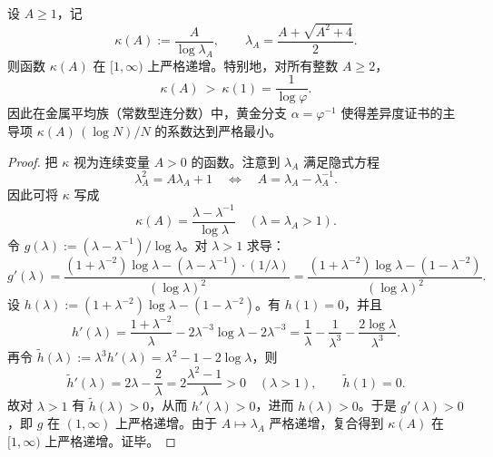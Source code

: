 \begin{theorem}\label{thm:metallic-gap}
设 $A\ge 1$，记
\[
\kappa(A):=\frac{A}{\log\lambda_A},\qquad \lambda_A=\frac{A+\sqrt{A^2+4}}{2}.
\]
则函数 $\kappa(A)$ 在 $[1,\infty)$ 上严格递增。特别地，对所有整数 $A\ge 2$，
\[
\kappa(A)\ >\ \kappa(1)=\frac{1}{\log\varphi}.
\]
因此在金属平均族（常数型连分数）中，黄金分支 $\alpha=\varphi^{-1}$ 使得差异度证书的主导项 \(\kappa(A)\,(\log N)/N\) 的系数达到严格最小。
\end{theorem}

\begin{proof}
把 $\kappa$ 视为连续变量 $A>0$ 的函数。注意到 $\lambda_A$ 满足隐式方程
\[
\lambda_A^2=A\lambda_A+1
\quad\Longleftrightarrow\quad
A=\lambda_A-\lambda_A^{-1}.
\]
因此可将 $\kappa$ 写成
\[
\kappa(A)=\frac{\lambda-\lambda^{-1}}{\log\lambda}
\quad(\lambda=\lambda_A>1).
\]
令 $g(\lambda):=(\lambda-\lambda^{-1})/\log\lambda$。对 $\lambda>1$ 求导：
\[
g'(\lambda)=\frac{(1+\lambda^{-2})\log\lambda-(\lambda-\lambda^{-1})\cdot(1/\lambda)}{(\log\lambda)^2}
=\frac{(1+\lambda^{-2})\log\lambda-(1-\lambda^{-2})}{(\log\lambda)^2}.
\]
设 $h(\lambda):=(1+\lambda^{-2})\log\lambda-(1-\lambda^{-2})$。有 $h(1)=0$，并且
\[
h'(\lambda)=\frac{1+\lambda^{-2}}{\lambda}-2\lambda^{-3}\log\lambda-2\lambda^{-3}
=\frac{1}{\lambda}-\frac{1}{\lambda^3}-\frac{2\log\lambda}{\lambda^3}.
\]
再令 $\tilde h(\lambda):=\lambda^3 h'(\lambda)=\lambda^2-1-2\log\lambda$，则
\[
\tilde h'(\lambda)=2\lambda-\frac{2}{\lambda}=2\frac{\lambda^2-1}{\lambda}>0\quad(\lambda>1),
\qquad \tilde h(1)=0.
\]
故对 $\lambda>1$ 有 $\tilde h(\lambda)>0$，从而 $h'(\lambda)>0$，进而 $h(\lambda)>0$。于是 $g'(\lambda)>0$，即 $g$ 在 $(1,\infty)$ 上严格递增。由于 $A\mapsto\lambda_A$ 严格递增，复合得到 $\kappa(A)$ 在 $[1,\infty)$ 上严格递增。证毕。
\end{proof}
